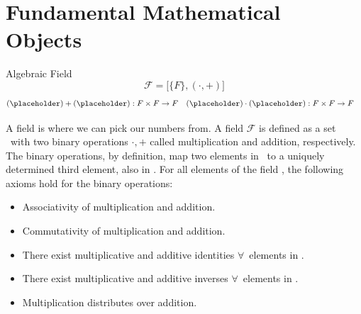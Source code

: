 \section{Fundamental Mathematical Objects}
	\begin{mathbox}{Algebraic Field}
		\begin{equation*}
			\mathcal{F}=\big[\{F\},(\cdot,+)\big]
		\end{equation*}
		\begin{align*}
			(\placeholder)+(\placeholder):F\times F&\rightarrow F
			&
			(\placeholder)\cdot(\placeholder):F\times F&\rightarrow F
		\end{align*}
	\end{mathbox}
A field is where we can pick our numbers from. A field \(\mathcal{F}\) is defined as a set \Fset\ with two binary operations \(\cdot,+\) called multiplication and addition, respectively.
The binary operations, by definition, map two elements in \Fset\ to a uniquely determined third element, also in \Fset. For all elements of the field \Fset, the following axioms hold for the binary operations:
\begin{itemize}
	\item Associativity of multiplication and addition.
	\item Commutativity of multiplication and addition.
	\item There exist multiplicative and additive identities \(\forall\)\ elements in \Fset.
	\item There exist multiplicative and additive inverses \(\forall\)\ elements in \Fset.
	\item Multiplication distributes over addition.
\end{itemize}

